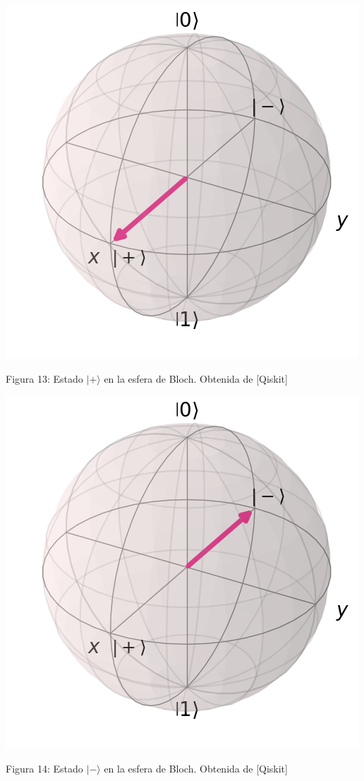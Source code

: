 \documentclass{article}
\numberwithin{equation}{section} %
\begin{document}
    \begin{minipage}{0.1\textwidth}
        \hfill
    \end{minipage}
    \begin{minipage}{0.3\textwidth}
        \centering
        \includegraphics[width=\textwidth]{img/Bloch/bloch_state_+.png}
        \caption{Figura 13: Estado $|+\rangle$ en la esfera de Bloch. Obtenida de [Qiskit]}
    \end{minipage}
    \hfill
    \begin{minipage}{0.3\textwidth}
        \centering
        \includegraphics[width=\textwidth]{img/Bloch/bloch_state_-.png}
        \caption{Figura 14: Estado $|-\rangle$ en la esfera de Bloch. Obtenida de [Qiskit]}
    \end{minipage}
\end{document}
